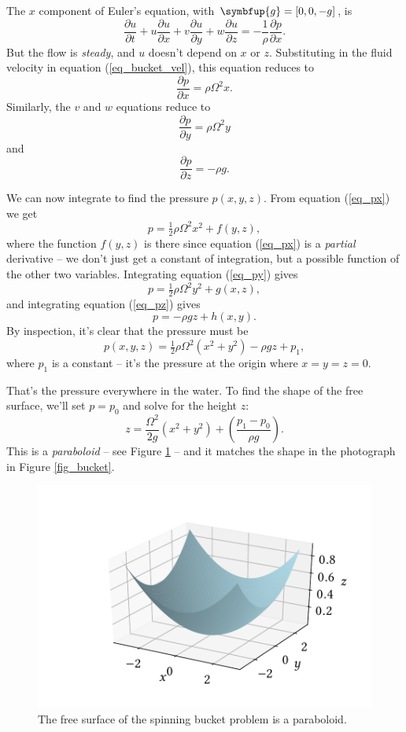 The $x$ component of Euler's equation, with $\symbfup{g} = [0,0,-g]$, is
\[
\frac{\partial u}{\partial t} + u\frac{\partial u}{\partial x} +  v\frac{\partial u}{\partial y} + w\frac{\partial u}{\partial z} = -\frac{1}{\rho} \frac{\partial p}{\partial x}.
\]
But the flow is \emph{steady}, and $u$ doesn't depend on $x$ or $z$.  Substituting in the fluid velocity in equation (\ref{eq_bucket_vel}), this equation reduces to
\begin{equation}
\label{eq_px}
\frac{\partial p}{\partial x} = \rho \Omega^2 x.
\end{equation}
Similarly, the $v$ and $w$ equations reduce to
\begin{equation}
\label{eq_py}
\frac{\partial p}{\partial y} = \rho \Omega^2 y
\end{equation}
and
\begin{equation}
\label{eq_pz}
\frac{\partial p}{\partial z} = -\rho g.
\end{equation}

We can now integrate to find the pressure $p(x, y, z)$.  From equation (\ref{eq_px}) we get
\[
p = \tfrac{1}{2} \rho \Omega^2 x^2 + f(y, z),
\]
where the function $f(y,z)$ is there since equation (\ref{eq_px}) is a \emph{partial} derivative -- we don't just get a constant of integration, but a possible function of the other two variables.  Integrating equation (\ref{eq_py}) gives
\[
p = \tfrac{1}{2} \rho \Omega^2 y^2 + g(x, z),
\]
and integrating equation (\ref{eq_pz}) gives
\[
p = -\rho g z + h(x, y).
\]
By inspection, it's clear that the pressure must be
\[
p(x, y, z) = \tfrac{1}{2} \rho \Omega^2 (x^2 + y^2) - \rho gz + p_1,
\]
where $p_1$ is a constant -- it's the pressure at the origin where $x=y=z=0$.

That's the pressure everywhere in the water.  To find the shape of the free surface, we'll set $p = p_0$ and solve for the height $z$:
\begin{equation}
z = \frac{\Omega^2}{2g} (x^2 + y^2) + \left( \frac{p_1 - p_0}{\rho g} \right).
\end{equation}
This is a \emph{paraboloid} -- see Figure \ref{fig_bucket_para} -- and it matches the shape in the photograph in Figure \ref{fig_bucket}.

\begin{figure}
\centering\includegraphics[width=0.8\linewidth]{Figures/Chapter3/fig_paraboloid}
\caption{The free surface of the spinning bucket problem is a paraboloid. }
\label{fig_bucket_para}
\end{figure}





